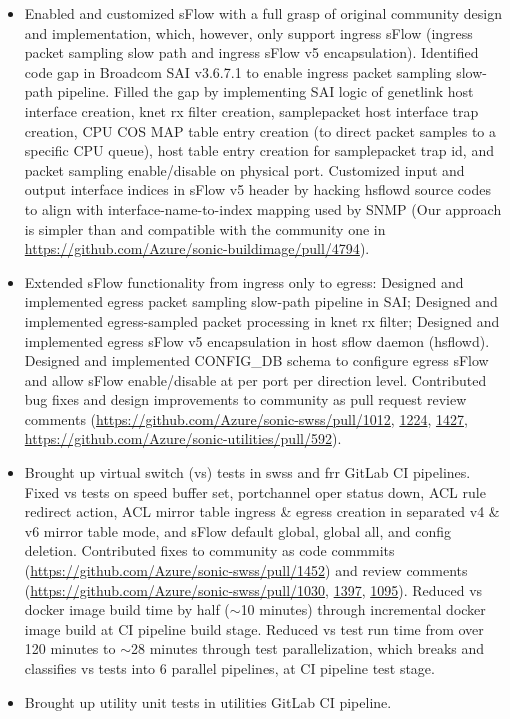 \documentclass[letterpaper,11pt]{article}
\newcommand{\resitem}[1]{\item #1 \vspace{-2pt}}
\begin{document}
\begin{itemize}
\begin{itemize}
{  at merge request creation and updates.}
  \resitem{Enabled and customized sFlow with a full grasp of original community design and implementation,
  which, however, only support ingress sFlow (ingress packet sampling slow path and ingress sFlow v5 encapsulation).
  Identified code gap in Broadcom SAI v3.6.7.1 to enable ingress packet sampling slow-path pipeline.
  Filled the gap by implementing SAI logic of genetlink host interface creation, knet rx filter creation, samplepacket host interface trap creation,
  CPU COS MAP table entry creation (to direct packet samples to a specific CPU queue), host table entry creation for samplepacket trap id,
  and packet sampling enable/disable on physical port.
  Customized input and output interface indices in sFlow v5 header by hacking hsflowd source codes
  to align with interface-name-to-index mapping used by SNMP
  (Our approach is simpler than and compatible with the community one in \url{https://github.com/Azure/sonic-buildimage/pull/4794}).}
  \resitem{Extended sFlow functionality from ingress only to egress: Designed and implemented egress packet sampling slow-path pipeline in SAI;
  Designed and implemented egress-sampled packet processing in knet rx filter;
  Designed and implemented egress sFlow v5 encapsulation in host sflow daemon (hsflowd).
  Designed and implemented CONFIG\_DB schema to configure egress sFlow and allow sFlow enable/disable at per port per direction level.
  Contributed bug fixes and design improvements to community as pull request review comments (\url{https://github.com/Azure/sonic-swss/pull/1012},
  \url{1224}, \url{1427},
  \url{https://github.com/Azure/sonic-utilities/pull/592}).}
  \resitem{Brought up virtual switch (vs) tests in swss and frr GitLab CI pipelines.
  Fixed vs tests on speed buffer set, portchannel oper status down, ACL rule redirect action,
  ACL mirror table ingress \& egress creation in separated v4 \& v6 mirror table mode, and sFlow default global, global all, and config deletion.
  Contributed fixes to community as code commmits (\url{https://github.com/Azure/sonic-swss/pull/1452}) and review comments
  (\url{https://github.com/Azure/sonic-swss/pull/1030}, \url{1397}, \url{1095}).
  Reduced vs docker image build time by half ({\tt $\sim$}10 minutes) through incremental docker image build at CI pipeline build stage.
  Reduced vs test run time from over 120 minutes to {\tt $\sim$}28 minutes through test parallelization,
  which breaks and classifies vs tests into 6 parallel pipelines, at CI pipeline test stage.}
  \resitem{Brought up utility unit tests in utilities GitLab CI pipeline.
}
\end{itemize}
\end{itemize}
\end{document}

